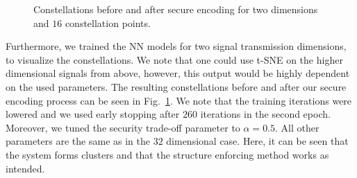 \documentclass[conference, 10pt]{IEEEtran}
\begin{document}
%
%
%

\begin{figure}
    
	\centering
	\hspace{0.5cm}
	\caption{Constellations before and after secure encoding for two dimensions and $16$ constellation points.}
\label{fig:res_2d}
\end{figure}


Furthermore, we trained the NN models for two signal transmission dimensions, to visualize the constellations. We note that one could use t-SNE on the higher dimensional signals from above, however, this output would be highly dependent on the used parameters.
The resulting constellations before and after our secure encoding process can be seen in Fig.~\ref{fig:res_2d}. We note that the training iterations were lowered and we used early stopping after $260$ iterations in the second epoch. Moreover, we tuned the security trade-off parameter to $\alpha=0.5$. All other parameters are the same as in the $32$ dimensional case. Here, it can be seen that the system forms clusters and that the structure enforcing method works as intended.
\end{document}
